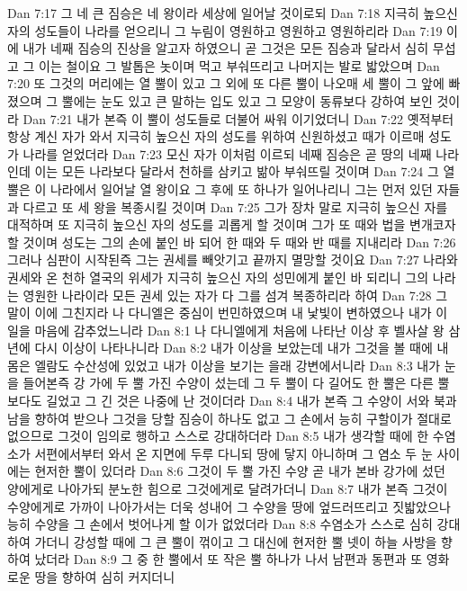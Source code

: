 Dan 7:17  그 네 큰 짐승은 네 왕이라 세상에 일어날 것이로되
Dan 7:18  지극히 높으신 자의 성도들이 나라를 얻으리니 그 누림이 영원하고 영원하고 영원하리라
Dan 7:19  이에 내가 네째 짐승의 진상을 알고자 하였으니 곧 그것은 모든 짐승과 달라서 심히 무섭고 그 이는 철이요 그 발톱은 놋이며 먹고 부숴뜨리고 나머지는 발로 밟았으며
Dan 7:20  또 그것의 머리에는 열 뿔이 있고 그 외에 또 다른 뿔이 나오매 세 뿔이 그 앞에 빠졌으며 그 뿔에는 눈도 있고 큰 말하는 입도 있고 그 모양이 동류보다 강하여 보인 것이라
Dan 7:21  내가 본즉 이 뿔이 성도들로 더불어 싸워 이기었더니
Dan 7:22  옛적부터 항상 계신 자가 와서 지극히 높으신 자의 성도를 위하여 신원하셨고 때가 이르매 성도가 나라를 얻었더라
Dan 7:23  모신 자가 이처럼 이르되 네째 짐승은 곧 땅의 네째 나라인데 이는 모든 나라보다 달라서 천하를 삼키고 밞아 부숴뜨릴 것이며
Dan 7:24  그 열 뿔은 이 나라에서 일어날 열 왕이요 그 후에 또 하나가 일어나리니 그는 먼저 있던 자들과 다르고 또 세 왕을 복종시킬 것이며
Dan 7:25  그가 장차 말로 지극히 높으신 자를 대적하며 또 지극히 높으신 자의 성도를 괴롭게 할 것이며 그가 또 때와 법을 변개코자 할 것이며 성도는 그의 손에 붙인 바 되어 한 때와 두 때와 반 때를 지내리라
Dan 7:26  그러나 심판이 시작된즉 그는 권세를 빼앗기고 끝까지 멸망할 것이요
Dan 7:27  나라와 권세와 온 천하 열국의 위세가 지극히 높으신 자의 성민에게 붙인 바 되리니 그의 나라는 영원한 나라이라 모든 권세 있는 자가 다 그를 섬겨 복종하리라 하여
Dan 7:28  그 말이 이에 그친지라 나 다니엘은 중심이 번민하였으며 내 낯빛이 변하였으나 내가 이 일을 마음에 감추었느니라
Dan 8:1  나 다니엘에게 처음에 나타난 이상 후 벨사살 왕 삼년에 다시 이상이 나타나니라
Dan 8:2  내가 이상을 보았는데 내가 그것을 볼 때에 내 몸은 엘람도 수산성에 있었고 내가 이상을 보기는 을래 강변에서니라
Dan 8:3  내가 눈을 들어본즉 강 가에 두 뿔 가진 수양이 섰는데 그 두 뿔이 다 길어도 한 뿔은 다른 뿔보다도 길었고 그 긴 것은 나중에 난 것이더라
Dan 8:4  내가 본즉 그 수양이 서와 북과 남을 향하여 받으나 그것을 당할 짐승이 하나도 없고 그 손에서 능히 구할이가 절대로 없으므로 그것이 임의로 행하고 스스로 강대하더라
Dan 8:5  내가 생각할 때에 한 수염소가 서편에서부터 와서 온 지면에 두루 다니되 땅에 닿지 아니하며 그 염소 두 눈 사이에는 현저한 뿔이 있더라
Dan 8:6  그것이 두 뿔 가진 수양 곧 내가 본바 강가에 섰던 양에게로 나아가되 분노한 힘으로 그것에게로 달려가더니
Dan 8:7  내가 본즉 그것이 수양에게로 가까이 나아가서는 더욱 성내어 그 수양을 땅에 엎드러뜨리고 짓밟았으나 능히 수양을 그 손에서 벗어나게 할 이가 없었더라
Dan 8:8  수염소가 스스로 심히 강대하여 가더니 강성할 때에 그 큰 뿔이 꺾이고 그 대신에 현저한 뿔 넷이 하늘 사방을 향하여 났더라
Dan 8:9  그 중 한 뿔에서 또 작은 뿔 하나가 나서 남편과 동편과 또 영화로운 땅을 향하여 심히 커지더니

